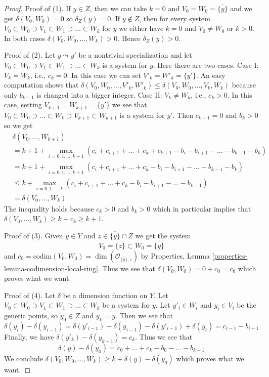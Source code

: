\begin{proof}
Proof of (1). If $y \in Z$, then we can take $k = 0$ and
$V_0 = W_0 = \overline{\{y\}}$ and we get $\delta(V_0, W_0) = 0$ so
$\delta_Z(y) = 0$. If $y \not \in Z$, then for every system
$V_0 \subset W_0 \supset V_1 \subset W_1 \supset \ldots \subset W_k$
for $y$ we either have $k = 0$ and $V_0 \not = W_0$ or $k > 0$.
In both cases $\delta(V_0, W_0, \ldots, W_k) > 0$. Hence $\delta_Z(y) > 0$.

\medskip\noindent
Proof of (2). Let $y \leadsto y'$ be a nontrivial specialization and let
$V_0 \subset W_0 \supset V_1 \subset W_1 \supset \ldots \subset W_k$
is a system for $y$. Here there are two cases.
Case I: $V_k = W_k$, i.e., $c_k = 0$. In this case
we can set $V'_k = W'_k = \overline{\{y'\}}$.
An easy computation shows that
$\delta(V_0, W_0, \ldots, V'_k, W'_k) \leq
\delta(V_0, W_0, \ldots, V_k, W_k)$
because only $b_{k - 1}$ is changed into a bigger integer.
Case II: $V_k \not = W_k$, i.e., $c_k > 0$.
In this case, setting $V_{k + 1} = W_{k + 1} = \overline{\{y'\}}$
we see that $V_0 \subset W_0 \supset \ldots \subset W_k \supset V_{k + 1}
\subset W_{k + 1}$ is a system for $y'$. Then $c_{k + 1} = 0$ and
$b_k > 0$ so we get
\begin{align*}
& \delta(V_0, \ldots, W_{k + 1}) \\
& =
k + 1 +
\max_{i = 0, 1, \ldots, k + 1}
(c_i + c_{i + 1} + \ldots + c_k + c_{k + 1}
- b_i - b_{i + 1} - \ldots - b_{k - 1} - b_k) \\
& =
k + 1 +
\max_{i = 0, 1, \ldots, k + 1}
(c_i + c_{i + 1} + \ldots + c_k
- b_i - b_{i + 1} - \ldots - b_{k - 1} - b_k) \\
& \leq
k + \max_{i = 0, 1, \ldots, k}
(c_i + c_{i + 1} + \ldots + c_k - b_i - b_{i + 1} - \ldots - b_{k - 1}) \\
& = \delta(V_0, \ldots, W_k)
\end{align*}
The inequality holds because $c_k > 0$ and $b_k > 0$ which in particular
implies that $\delta(V_0, \ldots, W_k) \geq k + c_k \geq k + 1$.

\medskip\noindent
Proof of (3). Given $y \in Y$ and $z \in \overline{\{y\}} \cap Z$
we get the system
$$
V_0 = \overline{\{z\}} \subset W_0 = \overline{\{y\}}
$$
and $c_0 = \text{codim}(V_0, W_0) = \dim(\mathcal{O}_{\overline{\{y\}}, z})$
by Properties, Lemma \ref{properties-lemma-codimension-local-ring}.
Thus we see that $\delta(V_0, W_0) = 0 + c_0 = c_0$ which proves
what we want.

\medskip\noindent
Proof of (4). Let $\delta$ be a dimension function on $Y$.
Let $V_0 \subset W_0 \supset V_1 \subset W_1 \supset \ldots \subset W_k$
be a system for $y$. Let $y'_i \in W_i$ and $y_i \in V_i$ be the
generic points, so $y_0 \in Z$ and $y_k = y$. Then we see that
$$
\delta(y_i) - \delta(y_{i - 1}) =
\delta(y'_{i - 1}) - \delta(y_{i - 1}) - \delta(y'_{i - 1}) + \delta(y_i) =
c_{i - 1} - b_{i - 1}
$$
Finally, we have $\delta(y'_k) - \delta(y_{k - 1}) = c_k$.
Thus we see that
$$
\delta(y) - \delta(y_0) =
c_0 + \ldots + c_k - b_0 - \ldots - b_{k - 1}
$$
We conclude
$\delta(V_0, W_0, \ldots, W_k) \geq k + \delta(y) - \delta(y_0)$
which proves what we want.


\end{proof}

